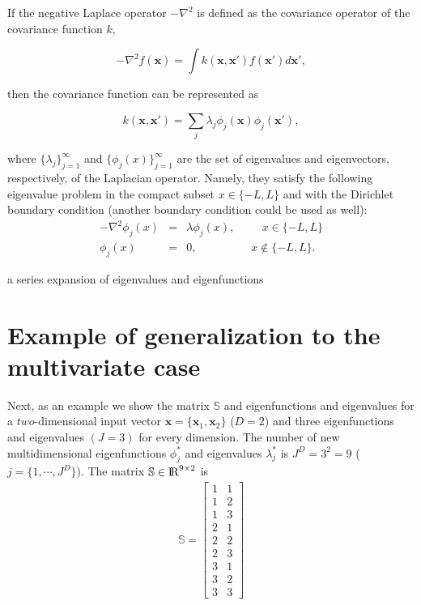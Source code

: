 \documentclass[]{interact}
\theoremstyle{plain}%
\theoremstyle{definition}
\theoremstyle{remark}
\begin{document}
If the negative Laplace operator $-\nabla^2$ is defined as the covariance operator of the covariance function $k$,

\begin{equation}
-\nabla^2 f(\mathbf{x}) = \int k(\mathbf{x},\mathbf{x}') f(\mathbf{x}') d\mathbf{x}',
\end{equation} 

\noindent then the covariance function can be represented as 

\begin{equation}
k(\mathbf{x},\mathbf{x}')= \sum_j \lambda_j \phi_j(\mathbf{x}) \phi_j(\mathbf{x}'),
\end{equation}

\noindent where $\{\lambda_j\}_{j=1}^{\infty}$ and $\{\phi_j(x)\}_{j=1}^{\infty}$ are the set of eigenvalues and eigenvectors, respectively, of the Laplacian operator. Namely, they satisfy the following eigenvalue problem in the compact subset $x \in \{-L,L\}$ and with the Dirichlet boundary condition (another boundary condition could be used as well):
%
\begin{eqnarray}
-\nabla^2 \phi_j(x)&=&\lambda \phi_j(x), \hspace{1cm}  x\in \{-L,L\} \nonumber \\ 
\phi_j(x)&=&0, \hspace{2cm} x\notin \{-L,L\}.
\end{eqnarray}  

a series expansion of eigenvalues and eigenfunctions 


\section{Example of generalization to the multivariate case}

Next, as an example we show the matrix $\mathbb{S}$ and eigenfunctions and eigenvalues for a $two$-dimensional input vector $\mathbf{x}=\{\mathbf{x}_1,\mathbf{x}_2\}$ ($D=2$) and three eigenfunctions and eigenvalues $(J=3)$ for every dimension. The number of new multidimensional eigenfunctions $\phi^{\ast}_j$ and eigenvalues $\lambda^{\ast}_j$ is $J^D=3^2=9$ ($j=\{1,\cdots,J^D\}$). The matrix $\mathbb{S}\in {\rm I\!R}^{9 \times 2}$ is
%
\begin{eqnarray}
\mathbb{S}=
\left[ {\begin{array}{cc}
1 & 1 \nonumber \\
1 & 2 \\
1 & 3 \\
2 & 1 \\
2 & 2 \\
2 & 3 \\
3 & 1 \\
3 & 2 \\
3 & 3
\end{array} } \right]
\end{eqnarray} 
\end{document}
